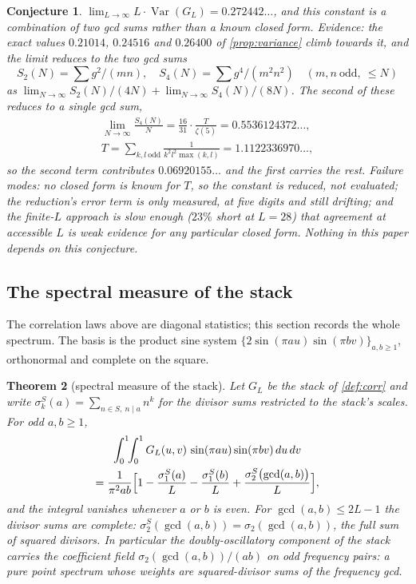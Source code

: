 \documentclass[11pt]{amsart}
\newtheorem{theorem}{Theorem}[section]
\newtheorem{conjecture}[theorem]{Conjecture}
\theoremstyle{definition}
\theoremstyle{remark}
\begin{document}
\begin{conjecture}
\label{con:variance}
$\lim_{L\to\infty}L\cdot\operatorname{Var}(G_L)=0.272442\ldots$, and this constant is a combination of two gcd sums rather than a known closed form. Evidence: the exact values $0.21014$, $0.24516$ and $0.26400$ of \cref{prop:variance} climb towards it, and the limit reduces to the two gcd sums
\[
S_2(N)=\sum g^2/(mn),\quad S_4(N)=\sum g^4/(m^2n^2)\quad(m,n\ \text{odd},\ \le N)
\]
as $\lim_{N\to\infty}S_2(N)/(4N)+\lim_{N\to\infty}S_4(N)/(8N)$. The second of these reduces to a single gcd sum,
\begin{gather*}
\lim_{N\to\infty}\frac{S_4(N)}{N}=\frac{16}{31}\cdot\frac{T}{\zeta(5)}=0.5536124372\ldots,\\
T=\sum_{k,l\ \text{odd}}\frac{1}{k^2l^2\max(k,l)}=1.1122336970\ldots,
\end{gather*}
so the second term contributes $0.06920155\ldots$ and the first carries the rest. Failure modes: no closed form is known for $T$, so the constant is \emph{reduced}, not evaluated; the reduction's error term is only measured, at five digits and still drifting; and the finite-$L$ approach is slow enough ($23\%$ short at $L=28$) that agreement at accessible $L$ is weak evidence for any particular closed form. Nothing in this paper depends on this conjecture.
\end{conjecture}

\subsection{The spectral measure of the stack}
\label{sec:spectrum}

The correlation laws above are diagonal statistics; this section records the whole spectrum. The basis is the product sine system $\{2\sin(\pi a u)\sin(\pi b v)\}_{a,b\ge1}$, orthonormal and complete on the square.

\begin{theorem}[spectral measure of the stack]
\label{thm:spectrum}
Let $G_L$ be the stack of \cref{def:corr} and write $\sigma_k^S(a) = \sum_{n \in S,\ n \mid a} n^k$ for the divisor sums restricted to the stack's scales. For odd $a, b \ge 1$,
\begin{multline*}
\int_0^1\!\!\int_0^1 G_L(u,v)\, \sin(\pi a u)\sin(\pi b v)\, du\, dv \\
= \frac{1}{\pi^2 ab} \Bigl[ 1 - \frac{\sigma_1^S(a)}{L} - \frac{\sigma_1^S(b)}{L} + \frac{\sigma_2^S\bigl(\gcd(a,b)\bigr)}{L} \Bigr],
\end{multline*}
and the integral vanishes whenever $a$ or $b$ is even. For $\gcd(a,b) \le 2L-1$ the divisor sums are complete: $\sigma_2^S(\gcd(a,b)) = \sigma_2(\gcd(a,b))$, the full sum of squared divisors. In particular the doubly-oscillatory component of the stack carries the coefficient field $\sigma_2(\gcd(a,b))/(ab)$ on odd frequency pairs: a pure point spectrum whose weights are squared-divisor sums of the frequency gcd.
\end{theorem}
\end{document}
